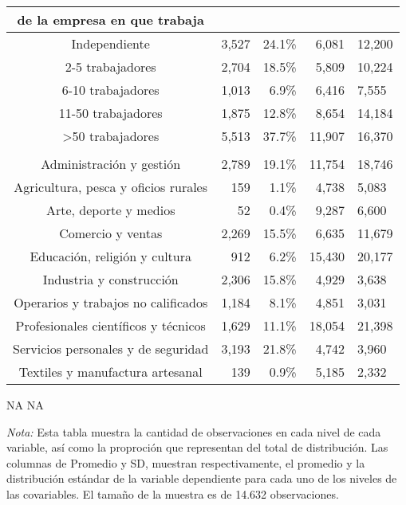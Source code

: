 \begin{longtable}{crrrl}
{{de la empresa en que trabaja}} \\[2.5pt] 
\midrule\addlinespace[2.5pt]
Independiente & 3,527 & 24.1\% &  6,081 & 12,200 \\ 
2-5 trabajadores & 2,704 & 18.5\% &  5,809 & 10,224 \\ 
6-10 trabajadores & 1,013 &  6.9\% &  6,416 &  7,555 \\ 
11-50 trabajadores & 1,875 & 12.8\% &  8,654 & 14,184 \\ 
>50 trabajadores & 5,513 & 37.7\% & 11,907 & 16,370 \\ 
\midrule\addlinespace[2.5pt]
\multicolumn{5}{l}{{\bfseries Oficio}} \\[2.5pt] 
\midrule\addlinespace[2.5pt]
Administración y gestión & 2,789 & 19.1\% & 11,754 & 18,746 \\ 
Agricultura, pesca y oficios rurales &   159 &  1.1\% &  4,738 &  5,083 \\ 
Arte, deporte y medios &    52 &  0.4\% &  9,287 &  6,600 \\ 
Comercio y ventas & 2,269 & 15.5\% &  6,635 & 11,679 \\ 
Educación, religión y cultura &   912 &  6.2\% & 15,430 & 20,177 \\ 
Industria y construcción & 2,306 & 15.8\% &  4,929 &  3,638 \\ 
Operarios y trabajos no calificados & 1,184 &  8.1\% &  4,851 &  3,031 \\ 
Profesionales científicos y técnicos & 1,629 & 11.1\% & 18,054 & 21,398 \\ 
Servicios personales y de seguridad & 3,193 & 21.8\% &  4,742 &  3,960 \\ 
Textiles y manufactura artesanal &   139 &  0.9\% &  5,185 &  2,332 \\ 
\bottomrule
\end{longtable}
\endgroup

NA
NA
\begin{minipage}{0.8\textwidth}
                                   \begin{tablenotes}
                                   \item \footnotesize \textit{Nota:} Esta tabla muestra la cantidad de observaciones en cada nivel de cada variable, 
                                   así como la proproción que representan del total de distribución.
                                   Las columnas de Promedio y SD, muestran respectivamente, el promedio y la distribución estándar
                                   de la variable dependiente para cada uno de los niveles de las covariables. 
                                   El tamaño de la muestra es de 14.632 observaciones.
                                   \end{tablenotes}
                                   \end{minipage}
